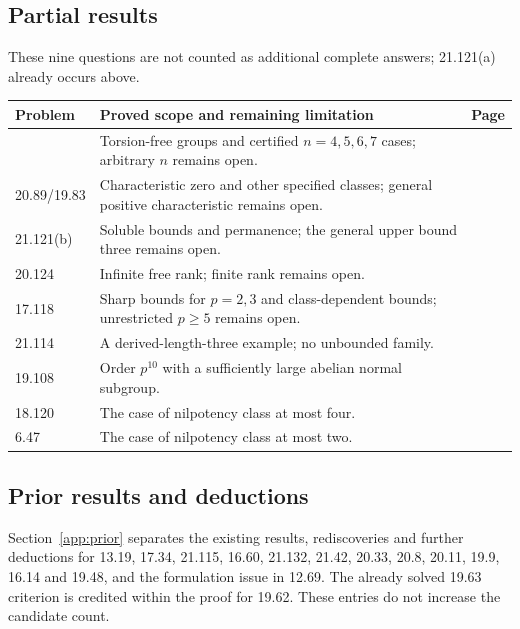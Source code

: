 \subsection*{Partial results}
These nine questions are not counted as additional complete answers;
21.121(a) already occurs above.
\small\begin{longtable}{@{}p{}>{\raggedright\arraybackslash}p{}r@{}}
\toprule Problem & Proved scope and remaining limitation & Page\\\midrule\endhead
\bottomrule\endfoot
20.100 & Torsion-free groups and certified $n=4,5,6,7$ cases; arbitrary $n$ remains open. & \pageref{partial:20.100} \\
20.89/19.83 & Characteristic zero and other specified classes; general positive characteristic remains open. & \pageref{partial:engel} \\
21.121(b) & Soluble bounds and permanence; the general upper bound three remains open. & \pageref{partial:jordan} \\
20.124 & Infinite free rank; finite rank remains open. & \pageref{partial:rb} \\
17.118 & Sharp bounds for $p=2,3$ and class-dependent bounds; unrestricted $p\geq5$ remains open. & \pageref{partial:17.118} \\
21.114 & A derived-length-three example; no unbounded family. & \pageref{partial:21.114} \\
19.108 & Order $p^{10}$ with a sufficiently large abelian normal subgroup. & \pageref{partial:19.108} \\
18.120 & The case of nilpotency class at most four. & \pageref{partial:18.120} \\
6.47 & The case of nilpotency class at most two. & \pageref{partial:6.47} \\
\end{longtable}
\normalsize
\subsection*{Prior results and deductions}
Section~\ref{app:prior} separates the existing results, rediscoveries and
further deductions for 13.19, 17.34, 21.115, 16.60, 21.132, 21.42, 20.33,
20.8, 20.11, 19.9, 16.14 and 19.48, and the formulation issue in 12.69.
The already solved 19.63 criterion is credited within the proof for 19.62.
These entries do not increase the candidate count.
